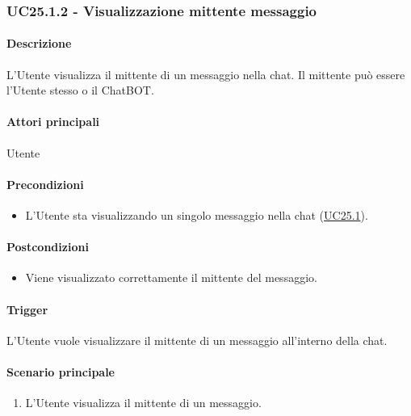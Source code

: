 \subsubsection{UC25.1.2 - Visualizzazione mittente messaggio}\label{UC25point1point2}
\paragraph*{Descrizione}
L'Utente visualizza il mittente di un messaggio nella chat. Il mittente può essere l'Utente stesso o il ChatBOT.

\paragraph*{Attori principali}
Utente

\paragraph*{Precondizioni}
\begin{itemize}
  \item L'Utente sta visualizzando un singolo messaggio nella chat (\hyperref[UC25point1]{UC25.1}).
\end{itemize}

\paragraph*{Postcondizioni}
\begin{itemize}
  \item Viene visualizzato correttamente il mittente del messaggio.
\end{itemize}

\paragraph*{Trigger}
L'Utente vuole visualizzare il mittente di un messaggio all'interno della chat.

\paragraph*{Scenario principale}
\begin{enumerate}
  \item L'Utente visualizza il mittente di un messaggio.
\end{enumerate}